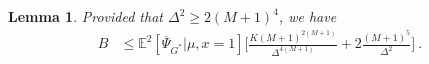\documentclass{article}
\newcommand{\alex}[1]{\textcolor{magenta}{[alex: #1]}}
\newtheorem{lemma}{Lemma}
\begin{document}
\begin{lemma}\label{prop:UBvar1}
Provided that $\Delta^2 \geq 2(M+1)^{4}$, we have 
    \begin{align*}
B 
&\leq \mathbb E^2[\overline{\Psi}_{G^*}|\mu,x=1]\Big[\frac{K(M+1)^{2(M+1)}}{\Delta^{4(M+1)}} + 2  \frac{(M+1)^{5}}{\Delta^{2}}\Big]\ . 
\end{align*}
\end{lemma}


\end{document}
